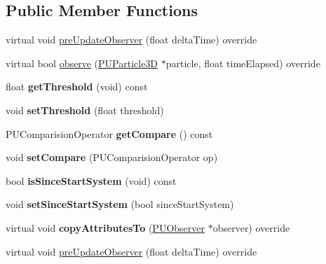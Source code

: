 \subsection*{Public Member Functions}
\begin{DoxyCompactItemize}
\item 
virtual void \hyperlink{classPUOnTimeObserver_a550ca101b37fc1969fff0997cb45373e}{pre\+Update\+Observer} (float delta\+Time) override
\item 
virtual bool \hyperlink{classPUOnTimeObserver_a15ec72bea8accd66333cd9b50e9683da}{observe} (\hyperlink{structPUParticle3D}{P\+U\+Particle3D} $\ast$particle, float time\+Elapsed) override
\item 
\mbox{\label{classPUOnTimeObserver_a72766a2323244161a8438aae55383058}} 
float {\bfseries get\+Threshold} (void) const
\item 
\mbox{\label{classPUOnTimeObserver_aa375aa00e8dd76660d478868d2bbb353}} 
void {\bfseries set\+Threshold} (float threshold)
\item 
\mbox{\label{classPUOnTimeObserver_a0850d13dcf1c419cf370c4252e456664}} 
P\+U\+Comparision\+Operator {\bfseries get\+Compare} () const
\item 
\mbox{\label{classPUOnTimeObserver_a8b05fa44560c25ea80fd54cdc28824b8}} 
void {\bfseries set\+Compare} (P\+U\+Comparision\+Operator op)
\item 
\mbox{\label{classPUOnTimeObserver_a7ecae2a7af5b78842eb96969064f21de}} 
bool {\bfseries is\+Since\+Start\+System} (void) const
\item 
\mbox{\label{classPUOnTimeObserver_a65f5b29d378daf66cf7166ba2d6a4473}} 
void {\bfseries set\+Since\+Start\+System} (bool since\+Start\+System)
\item 
\mbox{\label{classPUOnTimeObserver_a70ef4bbba00c2ba16b3f1a36a438e461}} 
virtual void {\bfseries copy\+Attributes\+To} (\hyperlink{classPUObserver}{P\+U\+Observer} $\ast$observer) override
\item 
virtual void \hyperlink{classPUOnTimeObserver_a4d17ab0ea123c3ad295b5fac1e9ff574}{pre\+Update\+Observer} (float delta\+Time) override

\end{DoxyCompactItemize}
